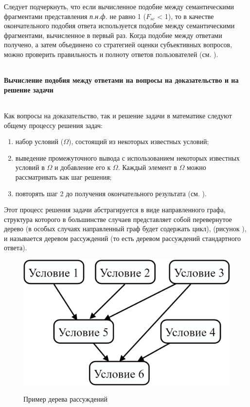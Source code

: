 Следует подчеркнуть, что если вычисленное подобие между семантическими фрагментами представления \textit{п.н.ф.} не равно 1 ($F_{sc}$ < 1), то в качестве окончательного подобия ответа используется подобие между семантическими фрагментами, вычисленное в первый раз. Когда подобие между ответами получено, а затем объединено со стратегией оценки субъективных вопросов, можно проверить правильность и полноту ответов пользователей (см. ).

~\\
\textbf{Вычисление подобия между ответами на вопросы на доказательство и на решение задачи} 

~\\
Как вопросы на доказательство, так и решение задачи в математике следуют общему процессу решения задач:

\begin{enumerate}
	\item набор условий ($\Omega $), состоящий из некоторых известных условий;
	
	\item выведение промежуточного вывода с использованием некоторых известных условий в $\Omega $ и добавление его к $\Omega $. Каждый элемент в $\Omega $ можно рассматривать как шаг решения;
	
	\item повторять шаг 2 до получения окончательного результата (см. ).
\end{enumerate}

Этот процесс решения задачи абстрагируется в виде направленного графа, структура которого в большинстве случаев представляет собой перевернутое дерево (в особых случаях направленный граф будет содержать цикл), (рисунок \textit{}), и называется деревом рассуждений (то есть деревом рассуждений стандартного ответа).

\begin{figure}[H]
	\caption{Пример дерева рассуждений}
	\includegraphics[scale=0.15]{author/part7/figures/reasoning_tree_example.png}
	\label{fig:RT_example}
\end{figure}


